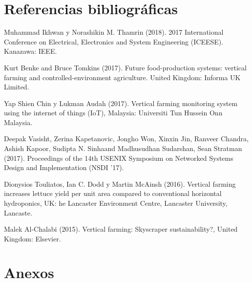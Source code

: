 \documentclass{report}
\begin{document}
\chapter{Referencias bibliográficas}
Muhammad Ikhwan y Norashikin M. Thamrin (2018). 2017 International Conference on
Electrical, Electronics and System Engineering (ICEESE). Kanazawa: IEEE.

Kurt Benke and Bruce Tomkins (2017). Future food-production systems: vertical
farming and controlled-environment agriculture. United Kingdom: Informa UK
Limited.

Yap Shien Chin y Lukman Audah (2017). Vertical farming monitoring system using
the internet of things (IoT), Malaysia: Universiti Tun Hussein Onn Malaysia.

Deepak Vasisht, Zerina Kapetanovic, Jongho Won, Xinxin Jin, Ranveer Chandra,
Ashish Kapoor, Sudipta N. Sinhaand Madhusudhan Sudarshan, Sean Stratman (2017).
Proceedings of the 14th USENIX Symposium on Networked Systems Design and
Implementation (NSDI ’17).

Dionysios Touliatos, Ian C. Dodd y Martin McAinsh (2016). Vertical farming
increases lettuce yield per unit area compared to conventional horizontal
hydroponics, UK: he Lancaster Environment Centre, Lancaster University,
Lancaste.

Malek Al-Chalabi (2015). Vertical farming: Skyscraper sustainability?, United
Kingdom: Elsevier.
\chapter{Anexos}
\end{document}
